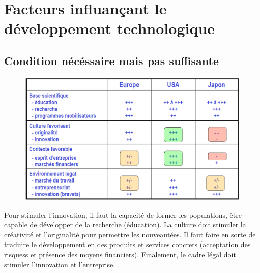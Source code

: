 \section{Facteurs influançant le développement technologique}
\subsection{Condition nécéssaire mais pas suffisante}
\begin{figure}
	\includegraphics[scale=0.35]{62}
\end{figure}
Pour stimuler l'innovation, il faut la capacité de former les populations, être capable de développer de la recherche (éducation). La culture doit stimuler la créativité et l'originalité pour permettre les nouveautées. Il faut faire en sorte de traduire le développement en des produits et services concrets (acceptation des risquess et présence des moyens financiers). Finalement, le cadre légal doit stimuler l'innovation et l'entreprise.  

